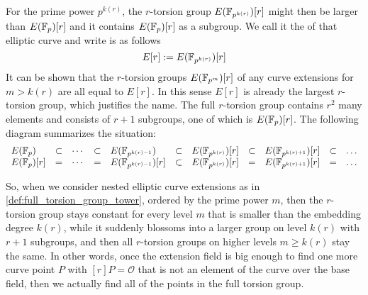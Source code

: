 For the prime power $p^{k(r)}$, the $r$-torsion group $E(\mathbb{F}_{p^{k(r)}})[r]$ might then be larger than $E(\mathbb{F}_p)[r]$ and it contains $E(\mathbb{F}_p)[r]$ as a subgroup. We call it the  of that elliptic curve and write is as follows
\begin{equation}
\label{def:full_torsion_group}
E[r] := E(\mathbb{F}_{p^{k(r)}})[r]
\end{equation}
It can be shown that the $r$-torsion groups $E(\mathbb{F}_{p^m})[r]$ of any curve extensions for $m>k(r)$ are all equal to $E[r]$. In this sense $E[r]$ is already the largest $r$-torsion group, which justifies the name. The full $r$-torsion group contains $r^2$ many elements and consists of $r+1$ subgroups, one of which is $E(\mathbb{F}_{p})[r]$. The following diagram summarizes the situation:
\begin{equation}
\label{def:full_torsion_group_tower}
\begin{array}{lccclclclcl}
E(\mathbb{F}_{p}) & \subset & \cdots  & \subset & E(\mathbb{F}_{p^{k(r)-1}}) & \subset & E(\mathbb{F}_{p^{k(r)}})[r] & \subset & E(\mathbb{F}_{p^{k(r)+1}})[r] & \subset & \ldots\\
E(\mathbb{F}_{p})[r] & = & \cdots  & = & E(\mathbb{F}_{p^{k(r)-1}})[r] & \subset & E(\mathbb{F}_{p^{k(r)}})[r] & = & 
E(\mathbb{F}_{p^{k(r)+1}})[r] & = & \ldots
\end{array}
\end{equation}

So, when we consider nested elliptic curve extensions as in \ref{def:full_torsion_group_tower}, ordered by the prime power $m$, then the $r$-torsion group stays constant for every level $m$ that is smaller than the embedding degree $k(r)$, while it suddenly blossoms into a larger group on level $k(r)$ with $r+1$ subgroups, and then all $r$-torsion groups on higher levels $m\geq k(r)$ stay the same. In other words, once the extension field is big enough to find one more curve point $P$ with $[r]P=\mathcal{O}$ that is not an element of the curve over the base field, then we actually find all of the points in the full torsion group.

